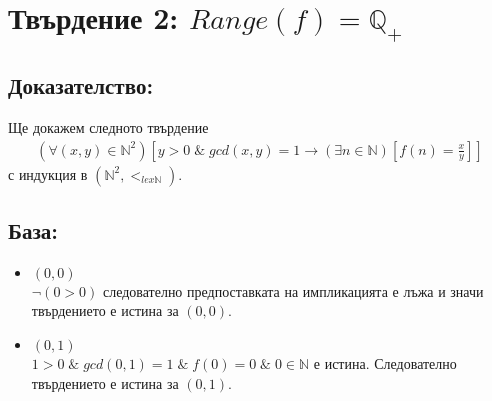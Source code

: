 \documentclass[a4paper, 12pt, oneside]{article}
\begin{document}
\section*{Твърдение 2: \(Range(f) = \mathbb{Q}_+\)}
\subsection*{Доказателство:}
Ще докажем следното твърдение
\begin{align*}
    (\forall (x, y) \in \mathbb{N}^2)\left[y > 0 \; \& \; gcd(x, y) = 1 \longrightarrow (\exists n \in \mathbb{N})\left[f(n) = \displaystyle\frac{x}{y}\right]\right]
\end{align*}
с индукция в \((\mathbb{N}^2, <_{lex\mathbb{N}})\).
\subsection*{База:}
\begin{itemize}
\item \((0, 0)\)\\
\(\lnot(0 > 0)\) следователно предпоставката на импликацията е лъжа и значи твърдението е истина за \((0, 0)\).
\item \((0, 1)\)\\
\(1 > 0 \; \& \; gcd(0, 1) = 1 \; \& \; f(0) = 0 \; \& \; 0 \in \mathbb{N}\) е истина.
Следователно твърдението е истина за \((0, 1)\).
\end{itemize}
\end{document}
